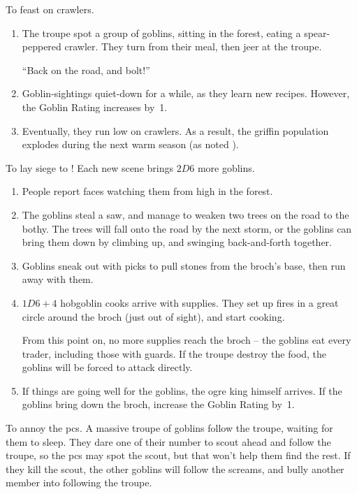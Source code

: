 \begin{multicols}{2}
\begin{dlist}
  \item
  To feast on crawlers.
  \begin{enumerate}
    \item
      The troupe spot a group of goblins, sitting in the forest, eating a spear-peppered \gls{crawler}.
    They turn from their meal, then jeer at the troupe.

    ``Back on the road, and bolt!''
    \item
    Goblin-sightings quiet-down for a while, as they learn new recipes.
    However, the Goblin Rating increases by~1.
    \item
    Eventually, they run low on \glspl{crawler}.
    As a result, the \gls{griffin} population explodes during the next warm season (as noted ).
  \end{enumerate}
  \item
  To lay siege to !
  Each new scene brings $2D6$ more goblins.
  \begin{enumerate}
    \item
    People report faces watching them from high in the forest.
    \item
    The goblins steal a saw, and manage to weaken two trees on the road to the \gls{bothy}.
    The trees will fall onto the road by the next storm, or the goblins can bring them down by climbing up, and swinging back-and-forth together.
    \item
    Goblins sneak out with picks to pull stones from the \gls{broch}'s base, then run away with them.
    \item
    $1D6+4$ hobgoblin cooks arrive with supplies.
    They set up fires in a great circle around the \gls{broch} (just out of sight), and start cooking.

    From this point on, no more supplies reach the \gls{broch} -- the goblins eat every trader, including those with \glspl{guard}.
    If the troupe destroy the food, the goblins will be forced to attack directly.
    \item
    If things are going well for the goblins, the \gls{ogre} king himself arrives.
    If the goblins bring down the \gls{broch}, increase the Goblin Rating by~1.
  \end{enumerate}
  \item
  To annoy the \glspl{pc}.
  A massive troupe of goblins follow the troupe, waiting for them to sleep.
  They dare one of their number to scout ahead and follow the troupe, so the \glspl{pc} may spot the scout, but that won't help them find the rest.
  If they kill the scout, the other goblins will follow the screams, and bully another member into following the troupe.


\end{dlist}
\end{multicols}
